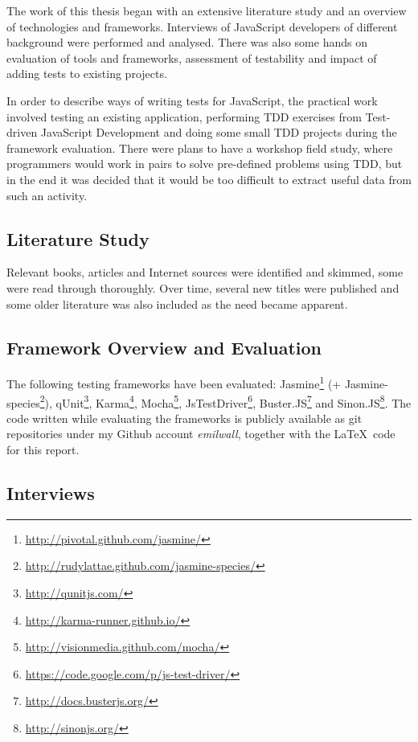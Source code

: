 \documentclass[11pt]{article}
\begin{document}
The work of this thesis began with an extensive literature study and an overview of technologies and frameworks. Interviews of JavaScript developers of different background were performed and analysed. There was also some hands on evaluation of tools and frameworks, assessment of testability and impact of adding tests to existing projects.

In order to describe ways of writing tests for JavaScript, the practical work involved testing an existing application, performing TDD exercises from Test-driven JavaScript Development \cite{Tddjs} and doing some small TDD projects during the framework evaluation. There were plans to have a workshop field study, where programmers would work in pairs to solve pre-defined problems using TDD, but in the end it was decided that it would be too difficult to extract useful data from such an activity.

\subsection{Literature Study}

Relevant books, articles and Internet sources were identified and skimmed, some were read through thoroughly. Over time, several new titles were published and some older literature was also included as the need became apparent.

\subsection{Framework Overview and Evaluation}

The following testing frameworks have been evaluated:
Jasmine\footnote{\url{http://pivotal.github.com/jasmine/}} (+ Jasmine-species\footnote{\url{http://rudylattae.github.com/jasmine-species/}}),
qUnit\footnote{\url{http://qunitjs.com/}},
Karma\footnote{\url{http://karma-runner.github.io/}},
Mocha\footnote{\url{http://visionmedia.github.com/mocha/}},
JsTestDriver\footnote{\url{https://code.google.com/p/js-test-driver/}},
Buster.JS\footnote{\url{http://docs.busterjs.org/}} and
Sinon.JS\footnote{\url{http://sinonjs.org/}}. The code written while evaluating the frameworks is publicly available as git repositories under my Github account \emph{emilwall}, together with the \LaTeX~code for this report.

\subsection{Interviews}
\end{document}
